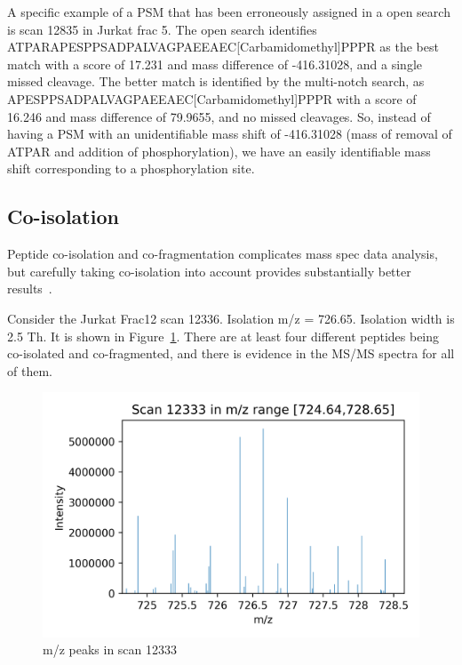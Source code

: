 \documentclass[journal=jprobs,manuscript=article]{achemso}
\begin{document}
A specific example of a PSM that has been erroneously assigned in a open search is scan 12835 in Jurkat frac 5.
The open search identifies ATPARAPESPPSADPALVAGPAEEAEC[Carbamidomethyl]PPPR as the best match with a score of 17.231 and mass difference of -416.31028, and a single missed cleavage.
The better match is identified by the multi-notch search, as APESPPSADPALVAGPAEEAEC[Carbamidomethyl]PPPR with a score of 16.246 and mass difference of 79.9655, and no missed cleavages.
So, instead of having a PSM with an unidentifiable mass shift of -416.31028 (mass of removal of ATPAR and addition of phosphorylation), we have an easily identifiable mass shift corresponding to a phosphorylation site.

\subsection{Co-isolation}

Peptide co-isolation and co-fragmentation complicates mass spec data analysis, but carefully taking co-isolation into account provides substantially better results~\cite{Zhang2014}.

Consider the Jurkat Frac12 scan 12336.
Isolation m/z  = 726.65.
Isolation width is 2.5 Th.
It is shown in Figure~\ref{fig:fig5-coIsolationSpectrum}.
There are at least four different peptides being co-isolated and co-fragmented, and there is evidence in the MS/MS spectra for all of them.

\begin{figure}[H]
\includegraphics{fig5-coIsolationSpectrum.png}
\caption{m/z peaks in scan 12333}
\label{fig:fig5-coIsolationSpectrum}
\end{figure}
\end{document}

